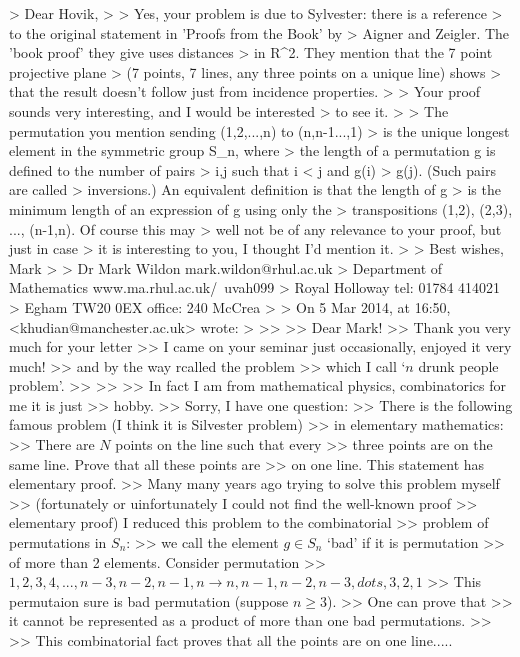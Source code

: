 > Dear Hovik,
>
> Yes, your problem is due to Sylvester: there is a reference
> to the original statement in 'Proofs from the Book' by
> Aigner and Zeigler. The 'book proof' they give uses distances
> in R^2. They mention that the 7 point projective plane
> (7 points, 7 lines, any three points on a unique line) shows
> that the result doesn't follow just from incidence properties.
>
> Your proof sounds very interesting, and I would be interested
> to see it.
>
> The permutation you mention sending (1,2,...,n) to (n,n-1...,1)
> is the unique longest element in the symmetric group S_n, where
> the length of a permutation g is defined to the number of pairs
> {i,j} such that i < j and g(i) > g(j). (Such pairs are called
> inversions.) An equivalent definition is that the length of g
> is the minimum length of an expression of g using only the
> transpositions (1,2), (2,3), ..., (n-1,n). Of course this may
> well not be of any relevance to your proof, but just in case
> it is interesting to you, I thought I'd mention it.
>
> Best wishes, Mark
>
> Dr Mark Wildon                          mark.wildon@rhul.ac.uk
> Department of Mathematics           www.ma.rhul.ac.uk/~uvah099
> Royal Holloway                               tel: 01784 414021
> Egham TW20 0EX                              office: 240 McCrea
>
> On 5 Mar 2014, at 16:50, <khudian@manchester.ac.uk> wrote:
>
>>
>>        Dear Mark!
>>  Thank you very much for your letter
>> I came on your seminar just occasionally, enjoyed it very much!
>> and by the way rcalled  the problem
>> which I call `$n$ drunk people problem'.
>>
>>
>>  In fact I am from mathematical physics, combinatorics for me it is just
>> hobby.
>> Sorry, I have one question:
>>  There is the following famous problem (I think it is Silvester problem)
>> in elementary mathematics:
>>  There are $N$ points on the line such that every
>> three points are on the same line. Prove that all these points are
>> on one line. This statement has elementary proof.
>> Many many years ago trying to solve this problem myself
>> (fortunately or uinfortunately I could not find the well-known proof
>> elementary proof) I reduced this problem to the combinatorial
>> problem of permutations in $S_n$:
>> we call the element $g\in S_n$ `bad' if it is permutation
>> of more than 2 elements.   Consider  permutation
>> $1,2,3,4,...,n-3,n-2,n-1,n\to n,n-1,n-2,n-3,dots,3,2,1$
>> This permutaion sure is bad permutation (suppose $n\geq 3$).
>> One can prove that
>> it cannot be represented as a product of more than one bad permutations.
>>
>> This combinatorial fact proves that all the points are on one line.....
